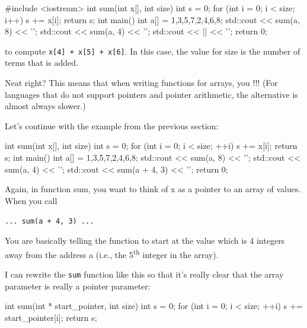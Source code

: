 \begin{consolethree}[escapeinside=||]
#include <iostream>
int sum(int x[], int size)
{
    int s = 0;
    for (int i = 0; i < size; i++)
    {
        s += x[i];
    }
    return s;
}
int main()
{
    int a[] = {1,3,5,7,2,4,6,8};
    std::cout << sum(a, 8) << '\n';
    std::cout << sum(a, 4) << '\n';
    std::cout << || << '\n';
    return 0;
}
\end{consolethree}

to compute \texttt{x[4] + x[5] + x[6]}. In this case, the value for size is the number of terms that is added.

Neat right? This means that when writing functions for arrays, you !!! (For languages that do not support pointers and pointer arithmetic, the alternative is almost always slower.)




\newpage{}

Let's continue with the example from the previous section:

\begin{consolethree}[escapeinside=||]
int sum(int x[], int size)
{
    int s = 0;
    for (int i = 0; i < size; ++i)
    {
        s += x[i];
    }
    return s;
}
int main()
{
    int a[] = {1,3,5,7,2,4,6,8};
    std::cout << sum(a, 8) << '\n';
    std::cout << sum(a, 4) << '\n';
    std::cout << sum(a + 4, 3) << '\n';
    return 0;
}
\end{consolethree}

Again, in function sum, you want to think of x as a pointer to an array
of values. When you call

\verb!... sum(a + 4, 3) ...!

You are basically telling the function to start at the value which is 4
integers away from the address a (i.e., the 5\textsuperscript{th}
integer in the array).

I can rewrite the \texttt{sum} function like this so that it's really
clear that the array parameter is really a pointer parameter:

\begin{consolethree}[escapeinside=||]
int sum(int * start_pointer, int size)
{
    int s = 0;
    for (int i = 0; i < size; ++i)
    {
        s += start_pointer[i];
    }
    return s;
}
\end{consolethree}

